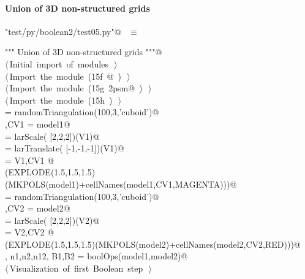 \documentclass[11pt,oneside]{article}	%
\begin{document}
\paragraph{Union of 3D non-structured grids}

\begin{flushleft} \small
\begin{minipage}{\linewidth} \label{scrap30}
\verb@"test/py/boolean2/test05.py"@\nobreak\ {\footnotesize {} }$\equiv$
\vspace{-1ex}
\begin{list}{}{} \item
\mbox{}\verb@""" Union of 3D non-structured grids """@\\
\mbox{}\verb@@\hbox{$\langle\,$Initial import of modules\nobreak\ {\footnotesize {}}$\,\rangle$}\verb@@\\
\mbox{}\verb@@\hbox{$\langle\,$Import the module\nobreak\ ({\footnotesize 15f\label{scrap31}
 }\mbox{}@ ) {\footnotesize {}}$\,\rangle$}\verb@@\\
\mbox{}\verb@@\hbox{$\langle\,$Import the module\nobreak\ ({\footnotesize 15g\label{scrap32}
 }\mbox{}\verb@lar2psm@ ) {\footnotesize {}}$\,\rangle$}\verb@@\\
\mbox{}\verb@@\hbox{$\langle\,$Import the module\nobreak\ ({\footnotesize 15h\label{scrap33}
 }\mbox{}\verb@myfont@ ) {\footnotesize {}}$\,\rangle$}\verb@@\\
\mbox{} = randomTriangulation(100,3,'cuboid')@\\
\mbox{},CV1 = model1@\\
\mbox{} = larScale( [2,2,2])(V1)@\\
\mbox{} = larTranslate( [-1,-1,-1])(V1)@\\
\mbox{} = V1,CV1 @\\
\mbox{}\verb@VIEW(EXPLODE(1.5,1.5,1.5)(MKPOLS(model1)+cellNames(model1,CV1,MAGENTA)))@\\
\mbox{} = randomTriangulation(100,3,'cuboid')@\\
\mbox{},CV2 = model2@\\
\mbox{} = larScale( [2,2,2])(V2)@\\
\mbox{} = V2,CV2 @\\
\mbox{}\verb@VIEW(EXPLODE(1.5,1.5,1.5)(MKPOLS(model2)+cellNames(model2,CV2,RED)))@\\
\mbox{}\verb@V, n1,n2,n12, B1,B2 = boolOps(model1,model2)@\\
\mbox{}\verb@@\hbox{$\langle\,$Visualization of first Boolean step\nobreak\ {\footnotesize {}}$\,\rangle$}\verb@@\\
\mbox{}\verb@@{\NWsep}
\end{list}
\vspace{-2ex}
\end{minipage}\\[4ex]
\end{flushleft}
\end{document}
